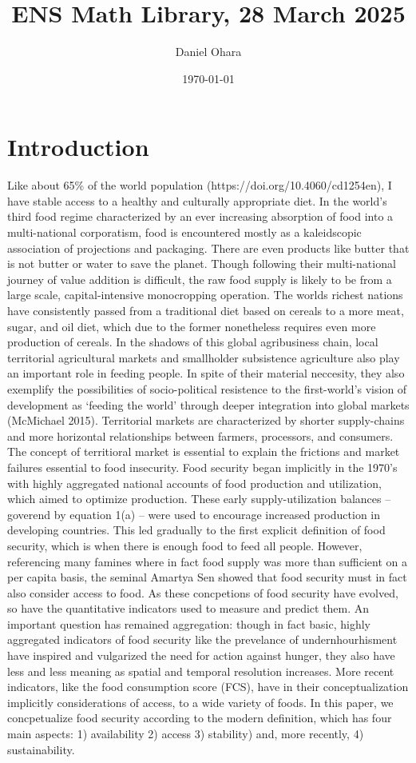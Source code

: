 \documentclass[11pt]{article}
\title{ENS Math Library, 28 March 2025}
\author{Daniel Ohara}
\date{\today}
\begin{document}
\maketitle
\section{Introduction}

Like about 65\% of the world population (https://doi.org/10.4060/cd1254en), I have stable access to a healthy and culturally appropriate diet. In the world's third food regime characterized by an ever increasing absorption of food into a multi-national corporatism, food is encountered mostly as a kaleidscopic association of projections and packaging. There are even products like butter that is not butter or water to save the planet. Though following their multi-national journey of value addition is difficult, the raw food supply is likely to be from a large scale, capital-intensive monocropping operation. The worlds richest nations have consistently passed from a traditional diet based on cereals to a more meat, sugar, and oil  diet, which due to the former nonetheless requires even more production of cereals. 
In the shadows of this global agribusiness chain, local territorial agricultural markets and smallholder subsistence agriculture also play an important role in feeding people. In spite of their material neccesity, they also exemplify the possibilities of socio-political resistence to the first-world's vision of development as `feeding the world' through deeper integration into global markets (McMichael 2015). Territorial markets are characterized by shorter supply-chains and more horizontal relationships between farmers, processors, and consumers. The concept of territioral market is essential to explain the frictions and market failures essential to food insecurity.
Food security began implicitly in the 1970's with highly aggregated national accounts of food production and utilization, which aimed to optimize production. These early supply-utilization balances -- goverend by equation 1(a) -- were used to encourage increased production in developing countries. This led gradually  to the first explicit definition of food security, which is when there is enough food to feed all people. However, referencing many famines where in fact food supply was more than sufficient on a per capita basis, the seminal Amartya Sen showed that food security must in fact also consider access to food. As these concpetions of food security have evolved, so have the quantitative indicators used to measure and predict them. An important question has remained aggregation: though in fact basic, highly aggregated indicators of food security like the prevelance of undernhourhisment have inspired and vulgarized the need for action against hunger, they also have less and less meaning as spatial and temporal resolution increases. More recent indicators, like the food consumption score (FCS), have in their conceptualization implicitly considerations of access, to a wide variety of foods. In this paper, we concpetualize food security according to the modern definition, which has four main aspects: 1) availability 2) access 3) stability) and, more recently, 4) sustainability.
\end{document}
